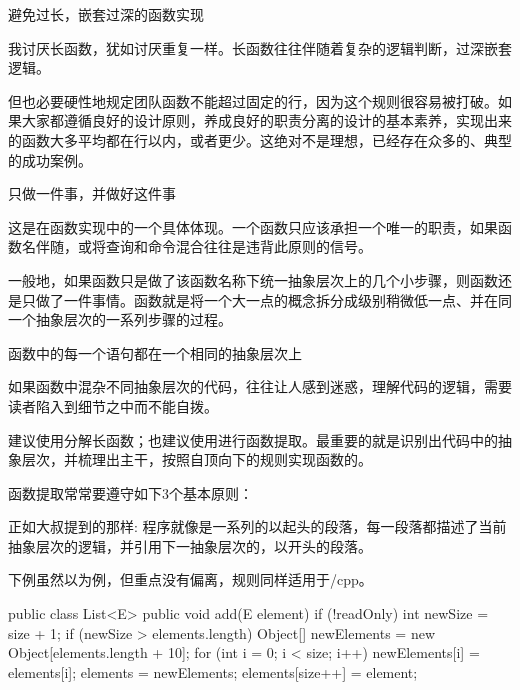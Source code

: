 \begin{content}

\begin{regulation}
避免过长，嵌套过深的函数实现
\end{regulation}

我讨厌长函数，犹如讨厌重复一样。长函数往往伴随着复杂的逻辑判断，过深嵌套逻辑。

但也必要硬性地规定团队函数不能超过固定的行，因为这个规则很容易被打破。如果大家都遵循良好的设计原则，养成良好的职责分离的设计的基本素养，实现出来的函数大多平均都在行以内，或者更少。这绝对不是理想，已经存在众多的、典型的成功案例。

\begin{regulation}
只做一件事，并做好这件事
\end{regulation}

这是在函数实现中的一个具体体现。一个函数只应该承担一个唯一的职责，如果函数名伴随，或将查询和命令混合往往是违背此原则的信号。

一般地，如果函数只是做了该函数名称下统一抽象层次上的几个小步骤，则函数还是只做了一件事情。函数就是将一个大一点的概念拆分成级别稍微低一点、并在同一个抽象层次的一系列步骤的过程。

\begin{regulation}
函数中的每一个语句都在一个相同的抽象层次上
\end{regulation}

如果函数中混杂不同抽象层次的代码，往往让人感到迷惑，理解代码的逻辑，需要读者陷入到细节之中而不能自拨。

建议使用分解长函数；也建议使用进行函数提取。最重要的就是识别出代码中的抽象层次，并梳理出主干，按照自顶向下的规则实现函数的。

函数提取常常要遵守如下3个基本原则：
\begin{enum}
\end{enum}

正如大叔提到的那样: 程序就像是一系列的以起头的段落，每一段落都描述了当前抽象层次的逻辑，并引用下一抽象层次的，以开头的段落。

下例虽然以为例，但重点没有偏离，规则同样适用于\clang{}/cpp{}。

\begin{leftbar}
\begin{java}
public class List<E> {
   public void add(E element) {
      if (!readOnly) {
         int newSize = size + 1;
         if (newSize > elements.length) {
            Object[] newElements =
               new Object[elements.length + 10];
            for (int i = 0; i < size; i++)
               newElements[i] = elements[i];
            elements = newElements;
         }
         elements[size++] = element;
      }
   }
}
\end{java}
\end{leftbar}


\end{content}
